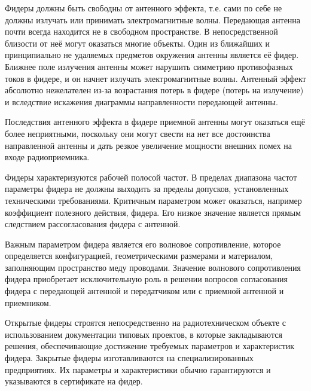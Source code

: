 Фидеры должны быть свободны от антенного эффекта, т.е. сами по себе не должны излучать или принимать электромагнитные волны. Передающая антенна почти всегда находится не в свободном пространстве. В непосредственной близости от неё могут оказаться многие объекты. Один из ближайших и принципиально не удаляемых предметов окружения антенны является её фидер. Ближнее поле излучения антенны может нарушить симметрию противофазных токов в фидере, и он начнет излучать электромагнитные волны. Антенный эффект абсолютно нежелателен из-за возрастания потерь в фидере (потерь на излучение) и вследствие искажения диаграммы направленности передающей антенны.

Последствия антенного эффекта в фидере приемной антенны могут оказаться ещё более неприятными, поскольку они могут свести на нет все достоинства направленной антенны и дать резкое увеличение мощности внешних помех на входе радиоприемника.

Фидеры характеризуются рабочей полосой частот. В пределах диапазона частот параметры фидера не должны выходить за пределы допусков, установленных техническими требованиями. Критичным параметром может оказаться, например коэффициент полезного действия, фидера. Его низкое значение является прямым следствием рассогласования фидера с антенной.

Важным параметром фидера является его волновое сопротивление, которое определяется конфигурацией, геометрическими размерами и материалом, заполняющим пространство меду проводами. Значение волнового сопротивления фидера приобретает исключительную роль в решении вопросов согласования фидера с передающей антенной и передатчиком или с приемной антенной и приемником.

Открытые фидеры строятся непосредственно на радиотехническом объекте с использованием документации типовых проектов, в которые закладываются решения, обеспечивающие достижение требуемых параметров и характеристик фидера. Закрытые фидеры изготавливаются на специализированных предприятиях. Их параметры и характеристики обычно гарантируются и указываются в сертификате на фидер.
